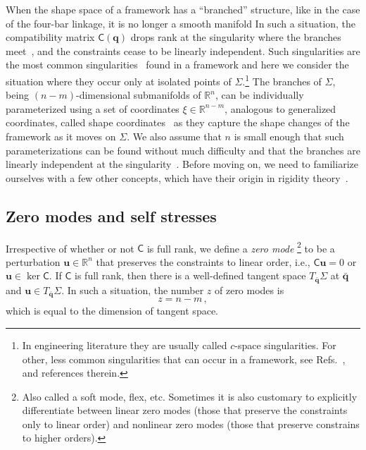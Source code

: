 When the shape space of a framework has a ``branched'' structure, like in the case of the four-bar linkage, it is no longer a smooth manifold
In such a situation, the compatibility matrix $\mathsf{C}(\bm{q})$ drops rank at the singularity where the branches meet~\cite{lopez-custodio2020,muller2019}, and the constraints cease to be linearly independent.
Such singularities are the most common singularities~\cite{lopez-custodio2019,lopez-custodio2020} found in a framework and here we consider the situation where they occur only at isolated points of $\Sigma$.\footnote{In engineering literature they are usually called $c$-space singularities. For other, less common singularities that can occur in a framework, see Refs.~\cite{lopez-custodio2020,muller2019,muller2017}, and references therein.}
The branches of $\Sigma$, being $(n-m)$-dimensional submanifolds of $\mathbb{R}^{n}$, can be individually parameterized using a set of coordinates $\xi \in \mathbb{R}^{n-m}$, analogous to generalized coordinates, called shape coordinates~\cite{littlejohn1995} as they capture the shape changes of the framework as it moves on $\Sigma$.
We also assume that $n$ is small enough that such parameterizations can be found without much difficulty and that
the branches are linearly independent at the singularity~\cite{lopez-custodio2020}.
Before moving on, we need to familiarize ourselves with a few other concepts, which have their origin in rigidity theory~\cite{connelly2022}.

\subsection{Zero modes and self stresses}

Irrespective of whether or not $\mathsf{C}$ is full rank, we define a \emph{zero mode}%
\footnote{Also called a soft mode, flex, etc.
Sometimes it is also customary to explicitly differentiate between linear zero modes (those that preserve the constraints only to linear order) and nonlinear zero modes (those that preserve constrains to higher orders).}
to be a perturbation $\bm{u} \in \mathbb{R}^n$ that preserves the constraints to linear order, i.e., $\mathsf{C}\bm{u} = 0$ or $\bm{u} \in \ker \mathsf{C}$.
If $\mathsf{C}$ is full rank, then there is a well-defined tangent space $T_{\bar{\bm{q}}}\Sigma$ at $\bar{\bm{q}}$ and $\bm{u} \in T_{\bar{\bm{q}}} \Sigma$.
In such a situation, the number $z$ of zero modes is
%
\begin{equation}
  z = n - m\,,
\end{equation}
%
which is equal to the dimension of tangent space.

